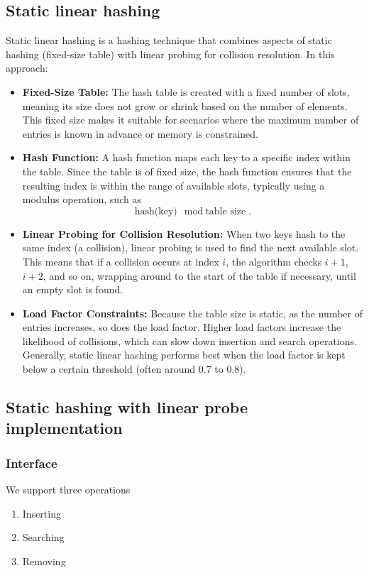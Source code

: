 \documentclass{report}
\begin{document}
\subsection{Static linear hashing}
\bigbreak \noindent 
Static linear hashing is a hashing technique that combines aspects of static hashing (fixed-size table) with linear probing for collision resolution. In this approach:
\begin{itemize}
    \item \textbf{Fixed-Size Table:} The hash table is created with a fixed number of slots, meaning its size does not grow or shrink based on the number of elements. This fixed size makes it suitable for scenarios where the maximum number of entries is known in advance or memory is constrained.
    \item \textbf{Hash Function:} A hash function maps each key to a specific index within the table. Since the table is of fixed size, the hash function ensures that the resulting index is within the range of available slots, typically using a modulus operation, such as
        \[
            \text{hash(key)} \mod \text{table size}.
        \]
    \item \textbf{Linear Probing for Collision Resolution:} When two keys hash to the same index (a collision), linear probing is used to find the next available slot. This means that if a collision occurs at index \( i \), the algorithm checks \( i + 1 \), \( i + 2 \), and so on, wrapping around to the start of the table if necessary, until an empty slot is found.
    \item \textbf{Load Factor Constraints:} Because the table size is static, as the number of entries increases, so does the load factor. Higher load factors increase the likelihood of collisions, which can slow down insertion and search operations. Generally, static linear hashing performs best when the load factor is kept below a certain threshold (often around 0.7 to 0.8).
\end{itemize}

\pagebreak 
\subsection{Static hashing with linear probe implementation}
\bigbreak \noindent 
\subsubsection{Interface}
\bigbreak \noindent 
We support three operations
\begin{enumerate}
    \item Inserting
    \item Searching
    \item Removing
\end{enumerate}
\bigbreak \noindent 
\end{document}
